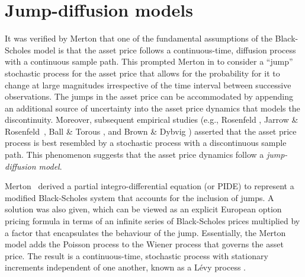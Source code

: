 \section{Jump-diffusion models}
	It was verified by Merton \cite{Merton1973b} that one of the fundamental assumptions of the Black-Scholes model is that the asset price follows a continuous-time, diffusion process with a continuous sample path. This prompted Merton in \cite{Merton1976} to consider a ``jump'' stochastic process for the asset price that allows for the probability for it to change at large magnitudes irrespective of the time interval between successive observations. The jumps in the asset price can be accommodated by appending an additional source of uncertainty into the asset price dynamics that models the discontinuity. Moreover, subsequent empirical studies (e.g., Rosenfeld \cite{Rosenfeld1980}, Jarrow \& Rosenfeld~\cite{Jarrow1984}, Ball \& Torous \cite{Ball1985}, and Brown \& Dybvig \cite{Brown1986}) asserted that the asset price process is best resembled by a stochastic process with a discontinuous sample path. This phenomenon suggests that the asset price dynamics follow a  \emph{jump-diffusion model}.

Merton~\cite{Merton1976} derived a partial integro-differential equation (or PIDE) to represent a modified Black-Scholes system that accounts for the inclusion of jumps. A solution was also given, which can be viewed as an explicit European option pricing formula in terms of an infinite series of Black-Scholes prices multiplied by a factor that encapsulates the behaviour of the jump. Essentially, the Merton model adds the Poisson process to the Wiener process that governs the asset price. The result is a continuous-time, stochastic process with stationary increments independent of one another, known as a L\'{e}vy process \cite{Platen2010}.

